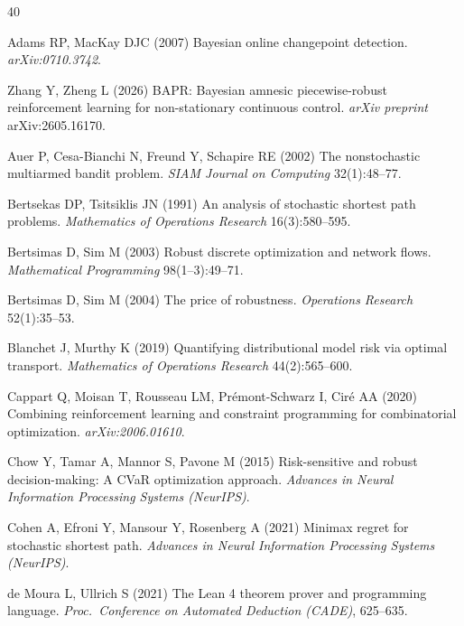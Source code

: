\documentclass[opre,dblanonrev]{informs4}
\begin{document}

\begin{thebibliography}{40}
\providecommand{\natexlab}[1]{#1}
\providecommand{\url}[1]{\texttt{#1}}

Adams RP, MacKay DJC (2007) Bayesian online changepoint detection.
\emph{arXiv:0710.3742}.

Zhang Y, Zheng L (2026) BAPR: Bayesian amnesic piecewise-robust reinforcement
learning for non-stationary continuous control. \emph{arXiv preprint}
arXiv:2605.16170.

Auer P, Cesa-Bianchi N, Freund Y, Schapire RE (2002) The nonstochastic
multiarmed bandit problem. \emph{SIAM Journal on Computing} 32(1):48--77.

Bertsekas DP, Tsitsiklis JN (1991) An analysis of stochastic shortest path
problems. \emph{Mathematics of Operations Research} 16(3):580--595.

Bertsimas D, Sim M (2003) Robust discrete optimization and network flows.
\emph{Mathematical Programming} 98(1--3):49--71.

Bertsimas D, Sim M (2004) The price of robustness.
\emph{Operations Research} 52(1):35--53.

Blanchet J, Murthy K (2019) Quantifying distributional model risk via
optimal transport. \emph{Mathematics of Operations Research} 44(2):565--600.

Cappart Q, Moisan T, Rousseau LM, Pr{\'e}mont-Schwarz I, Cir{\'e} AA (2020)
Combining reinforcement learning and constraint programming for
combinatorial optimization. \emph{arXiv:2006.01610}.

Chow Y, Tamar A, Mannor S, Pavone M (2015) Risk-sensitive and robust
decision-making: A CVaR optimization approach. \emph{Advances in Neural
Information Processing Systems (NeurIPS)}.

Cohen A, Efroni Y, Mansour Y, Rosenberg A (2021) Minimax regret for stochastic
shortest path. \emph{Advances in Neural Information Processing Systems
(NeurIPS)}.

de Moura L, Ullrich S (2021) The Lean 4 theorem prover and programming
language. \emph{Proc.\ Conference on Automated Deduction (CADE)},
625--635.


\end{thebibliography}
\end{document}
